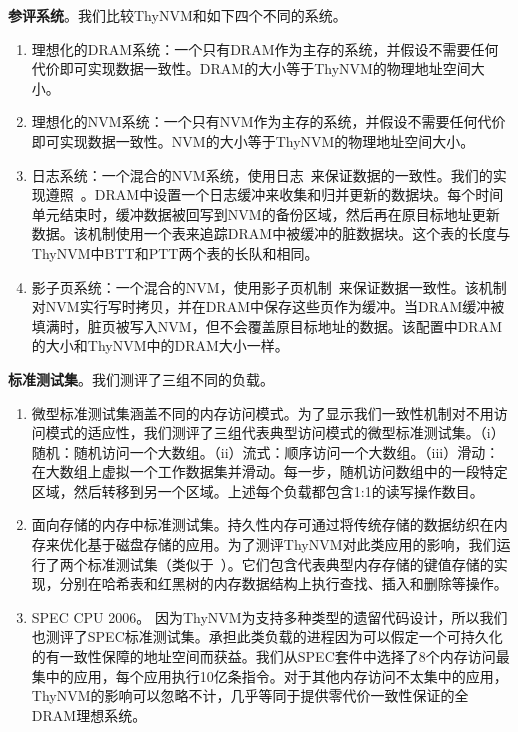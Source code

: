 \textbf{参评系统}。我们比较ThyNVM和如下四个不同的系统。
\begin{enumerate}
\item 理想化的DRAM系统：一个只有DRAM作为主存的系统，并假设不需要任何代价即可实现数据一致性。DRAM的大小等于ThyNVM的物理地址空间大小。 
\item 理想化的NVM系统：一个只有NVM作为主存的系统，并假设不需要任何代价即可实现数据一致性。NVM的大小等于ThyNVM的物理地址空间大小。 
\item 日志系统：一个混合的NVM系统，使用日志~\cite{DeWitt:1984:ITM:602259.602261, Hagmann:1987:RCF:41457.37518,
ext4}来保证数据的一致性。我们的实现遵照~\cite{Remzi:Journaling}。DRAM中设置一个日志缓冲来收集和归并更新的数据块。每个时间单元结束时，缓冲数据被回写到NVM的备份区域，然后再在原目标地址更新数据。该机制使用一个表来追踪DRAM中被缓冲的脏数据块。这个表的长度与ThyNVM中BTT和PTT两个表的长队和相同。 
\item 影子页系统：一个混合的NVM，使用影子页机制~\cite{bernstein2009principles}来保证数据一致性。该机制对NVM实行写时拷贝，并在DRAM中保存这些页作为缓冲。当DRAM缓冲被填满时，脏页被写入NVM，但不会覆盖原目标地址的数据。该配置中DRAM的大小和ThyNVM中的DRAM大小一样。
\end{enumerate}
 
\textbf{标准测试集}。我们测评了三组不同的负载。

\begin{enumerate}
\item 微型标准测试集涵盖不同的内存访问模式。为了显示我们一致性机制对不用访问模式的适应性，我们测评了三组代表典型访问模式的微型标准测试集。（i）随机：随机访问一个大数组。（ii）流式：顺序访问一个大数组。（iii）滑动：在大数组上虚拟一个工作数据集并滑动。每一步，随机访问数组中的一段特定区域，然后转移到另一个区域。上述每个负载都包含1:1的读写操作数目。
\item 面向存储的内存中标准测试集。持久性内存可通过将传统存储的数据纺织在内存来优化基于磁盘存储的应用。为了测评ThyNVM对此类应用的影响，我们运行了两个标准测试集（类似于~\cite{Coburn:2011:NMP:1950365.1950380, Zhao:2013:KCP:2540708.2540744}）。它们包含代表典型内存存储的键值存储的实现，分别在哈希表和红黑树的内存数据结构上执行查找、插入和删除等操作。 
\item SPEC CPU 2006。 因为ThyNVM为支持多种类型的遗留代码设计，所以我们也测评了SPEC标准测试集。承担此类负载的进程因为可以假定一个可持久化的有一致性保障的地址空间而获益。我们从SPEC套件中选择了8个内存访问最集中的应用，每个应用执行10亿条指令。对于其他内存访问不太集中的应用，ThyNVM的影响可以忽略不计，几乎等同于提供零代价一致性保证的全DRAM理想系统。 
\end{enumerate}

